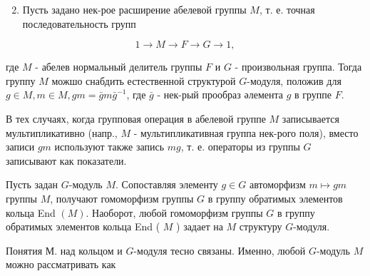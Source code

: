 \documentclass[10pt]{article}
\begin{document}
\begin{enumerate}

  \setcounter{enumi}{1}

  \item Пусть задано нек-рое расширение абелевой группы $M$, т. е. точная последовательность групп

\end{enumerate}



\[

1 \rightarrow M \rightarrow F \rightarrow G \rightarrow 1,

\]



где $M$ - абелев нормальный делитель группы $F$ и $G$ - произвольная группа. Тогда группу $M$ можшо снабдить естественной структурой $G$-модуля, положив для $g \in M, m \in M, g m=\bar{g} m \bar{g}^{-1}$, где $\bar{g}$ - нек-рый прообраз әлемента $g$ в группе $F$.



В тех случаях, когда групповая операция в абелевой группе $M$ записывается мультипликативно (напр., $M$ - мультипликативная группа нек-рого поля), вместо записи $g m$ используют также запись $m g$, т. е. операторы из группы $G$ записывают как показатели.



Пусть задан $G$-модуль $M$. Сопоставляя элементу $g \in G$ автоморфизм $m \longmapsto g m$ группы $M$, получают гомоморфизм группы $G$ в группу обратимых элементов кольца End $(M)$. Наоборот, любой гомоморфизм группы $G$ в группу обратимых элементов кольца End ( $M$ ) задает на $M$ структуру $G$-модуля.



Понятия М. над кольцом и $G$-модуля тесно связаны. Именно, любой $G$-модуль $M$ можно рассматривать как
\end{document}

